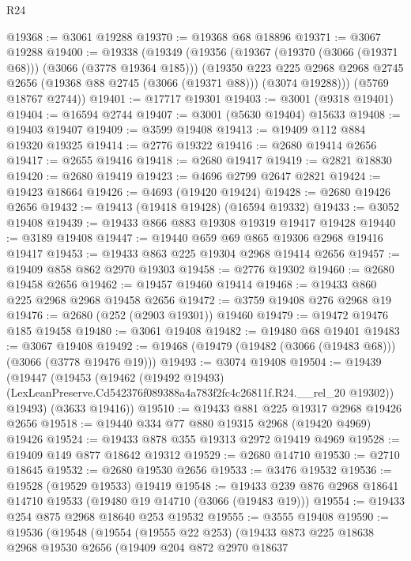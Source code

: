 \begin{lexlean}{R24}
\begin{coremodule}
@19368 := @3061 @19288
@19370 := @19368 @68 @18896
@19371 := @3067 @19288
@19400 := @19338
    (@19349
      (@19356
        (@19367 (@19370 (@3066 (@19371 @68))) (@3066 (@3778 @19364 @185)))
        (@19350
          @223
          @225
          @2968
          @2968
          @2745
          @2656
          (@19368 @88 @2745 (@3066 (@19371 @88)))
          (@3074 @19288)))
      (@5769 @18767 @2744))
@19401 := @17717 @19301
@19403 := @3001 (@9318 @19401)
@19404 := @16594 @2744
@19407 := @3001 (@5630 @19404) @15633
@19408 := @19403 @19407
@19409 := @3599 @19408
@19413 := @19409 @112 @884 @19320 @19325
@19414 := @2776 @19322
@19416 := @2680 @19414 @2656
@19417 := @2655 @19416
@19418 := @2680 @19417
@19419 := @2821 @18830
@19420 := @2680 @19419
@19423 := @4696 @2799 @2647 @2821
@19424 := @19423 @18664
@19426 := @4693 (@19420 @19424)
@19428 := @2680 @19426 @2656
@19432 := @19413 (@19418 @19428) (@16594 @19332)
@19433 := @3052 @19408
@19439 := @19433 @866 @883 @19308 @19319 @19417 @19428
@19440 := @3189 @19408
@19447 := @19440 @659 @69 @865 @19306 @2968 @19416 @19417
@19453 := @19433 @863 @225 @19304 @2968 @19414 @2656
@19457 := @19409 @858 @862 @2970 @19303
@19458 := @2776 @19302
@19460 := @2680 @19458 @2656
@19462 := @19457 @19460 @19414
@19468 := @19433 @860 @225 @2968 @2968 @19458 @2656
@19472 := @3759 @19408 @276 @2968 @19
@19476 := @2680 (@252 (@2903 @19301)) @19460
@19479 := @19472 @19476 @185 @19458
@19480 := @3061 @19408
@19482 := @19480 @68 @19401
@19483 := @3067 @19408
@19492 := @19468 (@19479 (@19482 (@3066 (@19483 @68))) (@3066 (@3778 @19476 @19)))
@19493 := @3074 @19408
@19504 := @19439
    (@19447
      (@19453
        (@19462
          (@19492 @19493)
          (LexLeanPreserve.Cd542376f089388a4a783f2fc4c26811f.R24.__rel_20 @19302))
        @19493)
      (@3633 @19416))
@19510 := @19433 @881 @225 @19317 @2968 @19426 @2656
@19518 := @19440 @334 @77 @880 @19315 @2968 (@19420 @4969) @19426
@19524 := @19433 @878 @355 @19313 @2972 @19419 @4969
@19528 := @19409 @149 @877 @18642 @19312
@19529 := @2680 @14710
@19530 := @2710 @18645
@19532 := @2680 @19530 @2656
@19533 := @3476 @19532
@19536 := @19528 (@19529 @19533) @19419
@19548 := @19433 @239 @876 @2968 @18641 @14710 @19533 (@19480 @19 @14710 (@3066 (@19483 @19)))
@19554 := @19433 @254 @875 @2968 @18640 @253 @19532
@19555 := @3555 @19408
@19590 := @19536
    (@19548
      (@19554
        (@19555 @22 @253)
        (@19433
          @873
          @225
          @18638
          @2968
          @19530
          @2656
          (@19409
            @204
            @872
            @2970
            @18637

\end{coremodule}
\end{lexlean}
